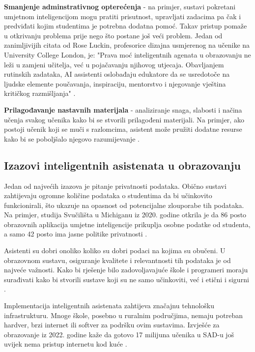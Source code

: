 \documentclass[]{foi}
\begin{document}
    \textbf{Smanjenje adminstrativnog opterećenja} - na primjer, sustavi pokretani umjetnom inteligencijom mogu pratiti prisutnost, upravljati zadacima pa čak i predviđati kojim
    studentima je potrebna dodatna pomoć. Takav pristup pomaže u otkrivanju problema prije nego što postane još veći problem. Jedan od zanimljivijih citata od Rose Luckin, profesorice dizajna
    usmjerenog na učenike na University College London, je: "Prava moć inteligentnih agenata u obrazovanju ne leži u zamjeni učitelja, već u pojačavanju njihovog utjecaja. Obavljanjem rutinskih
    zadataka, AI assistenti oslobađaju edukatore da se usredotoče na ljudske elemente poučavanja, inspiraciju, mentorstvo i njegovanje vještina kritičkog razmišljanja" \cite{weber2025smythos}. 
    
    
    \textbf{Prilagođavanje nastavnih materijala}   - analiziranje snaga, slabosti i načina učenja svakog učenika kako bi se stvorili prilagođeni materijali. Na primjer, ako postoji
    učenik koji se muči s razlomcima, asistent može pružiti dodatne resurse kako bi se poboljšalo njegovo razumijevanje \cite{weber2025smythos}.


\subsection{Izazovi inteligentnih asistenata u obrazovanju}

Jedan od najvećih izazova je pitanje privatnosti podataka. Obično sustavi zahtijevaju ogromne količine podataka o studentima da bi učinkovito funkcionirali, što ukazuje na opasnost od 
potencijalne zlouporabe tih podataka. Na primjer, studija Svučilišta u Michiganu iz 2020. godine otkrila je da 86 posto obrazovnih aplikacija umjetne inteligencije prikuplja osobne podatke od studenta,
a samo 42 posto ima jasne politike privatnosti \cite{weber2025smythos}.

Asistenti su dobri onoliko koliko su dobri podaci na kojima su obučeni. U obrazovnom sustavu, osiguranje kvalitete i relevantnosti tih podataka je od najveće važnosti.
Kako bi rješenje bilo zadovoljavajuće škole i programeri moraju surađivati kako bi stvorili sustave koji su ne samo učinkoviti, već i etični i sigurni \cite{weber2025smythos}.

Implementacija inteligentnih asistenata zahtijeva značajnu tehnološku infrastrukturu. Mnoge škole, posebno u ruralnim područjima, nemaju potreban hardver, brzi internet ili softver za podršku ovim sustavima.
Izvješće za obrazovanje iz 2022. godine kaže da gotovo 17 milijuna učenika u SAD-u još uvijek nema pristup internetu kod kuće \cite{weber2025smythos}.
\end{document}
